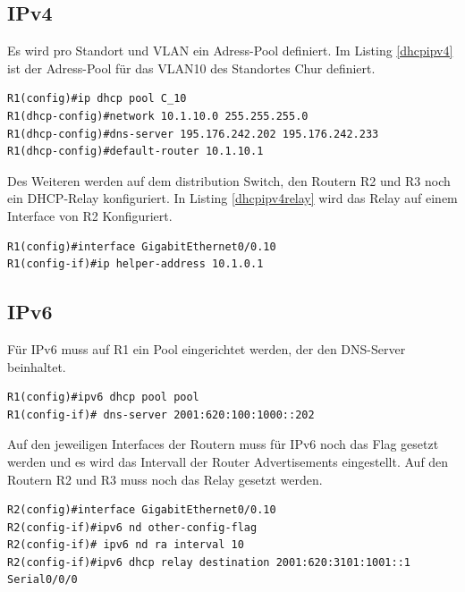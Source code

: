 \documentclass[11pt,a4paper]{scrreprt}
\begin{document}
\subsection{IPv4}
Es wird pro Standort und \acs{VLAN} ein Adress-Pool definiert. Im Listing \ref{dhcpipv4} ist der Adress-Pool für das \acs{VLAN}10 des Standortes Chur definiert.
\newline
\begin{lstlisting}[frame=single, breaklines=true, captionpos=b,caption= IPv4 \acs{DHCP}, label=dhcpipv4]
R1(config)#ip dhcp pool C_10
R1(dhcp-config)#network 10.1.10.0 255.255.255.0
R1(dhcp-config)#dns-server 195.176.242.202 195.176.242.233
R1(dhcp-config)#default-router 10.1.10.1
\end{lstlisting}
\noindent
Des Weiteren werden auf dem distribution Switch, den Routern R2 und R3 noch ein DHCP-Relay konfiguriert. In Listing \ref{dhcpipv4relay} wird das Relay auf einem Interface von R2 Konfiguriert.
\newline
\begin{lstlisting}[frame=single, breaklines=true, captionpos=b,caption= IPv4 \acs{DHCP}-relay, label=dhcpipv4relay]
R1(config)#interface GigabitEthernet0/0.10
R1(config-if)#ip helper-address 10.1.0.1
\end{lstlisting}



\subsection{IPv6}
Für IPv6 muss auf R1 ein Pool eingerichtet werden, der den \acs{DNS}-Server 
beinhaltet.
\newline
\begin{lstlisting}[frame=single, breaklines=true, captionpos=b,caption= IPv6 \acs{DHCP}, label=dhcpipv6]
R1(config)#ipv6 dhcp pool pool
R1(config-if)# dns-server 2001:620:100:1000::202
\end{lstlisting}

\noindent
Auf den jeweiligen Interfaces der Routern muss für IPv6 noch das Flag gesetzt werden und es wird das Intervall der Router Advertisements eingestellt. Auf den Routern R2 und R3 muss noch das Relay gesetzt werden.
\newline
\begin{lstlisting}[frame=single, breaklines=true, captionpos=b,caption= IPv6 \acs{DHCP}-relay, label=dhcpipv6relay]
R2(config)#interface GigabitEthernet0/0.10
R2(config-if)#ipv6 nd other-config-flag
R2(config-if)# ipv6 nd ra interval 10
R2(config-if)#ipv6 dhcp relay destination 2001:620:3101:1001::1 Serial0/0/0
\end{lstlisting}
 
\end{document}
